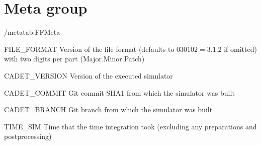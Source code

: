 \section{Meta group}

\begin{groupscope}{/meta}{tab:FFMeta}
  \begin{dataset}[type=int,inout={In}]{FILE\_FORMAT}
    Version of the file format (defaults to $030102 = 3.1.2$ if omitted) with two digits per part (Major.Minor.Patch)
  \end{dataset}
  \begin{dataset}[type=string,inout={Out}]{CADET\_VERSION}
    Version of the executed \CADET{} simulator
  \end{dataset}
  \begin{dataset}[type=string,inout={Out}]{CADET\_COMMIT}
    Git commit SHA1 from which the \CADET{} simulator was built
  \end{dataset}
  \begin{dataset}[type=string,inout={Out}]{CADET\_BRANCH}
    Git branch from which the \CADET{} simulator was built
  \end{dataset}
  \begin{dataset}[type=double,unit={\si{\second}},inout={Out}]{TIME\_SIM}
    Time that the time integration took (excluding any preparations and postprocessing)
  \end{dataset}
\end{groupscope}
